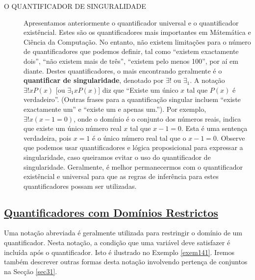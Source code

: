 \begin{description}
\item[O QUANTIFICADOR DE SINGURALIDADE] Apresentamos anteriormente o
quantificador universal e o quantificador existêncial. Estes são os
quantificadores mais importantes em Mátemática e Ciência da Computação. No
entanto, não existem limitações para o número de quantificadores que podemos
definir, tal como ``existem exactamente dois'', ``não existem mais de três'',
``existem pelo menos 100'', por aí em diante. Destes quantificadores, o mais
encontrando geralmente é o \textbf{quantificar de singularidade}, denotado por
$\exists!$ ou $\exists_1$. A notação $\exists!xP(x)$ [ou $\exists_1xP(x)$] diz
que ``Existe um único $x$ tal que $P(x)$ é verdadeiro''. (Outras frases para a
quantificação singular incluem ``existe exactamente um'' e ``existe um e apenas
um.''). Por exemplo, $\exists!x(x-1=0)$, onde o domínio é o conjunto dos números
reais, indica que existe um único número real $x$ tal que $x-1=0$. Esta é uma
sentença verdadeira, pois $x=1$ é o único número real tal que o $x-1=0$. Observe
que podemos usar quantificadores e lógica proposicional para expressar a
singularidade, caso queiramos evitar o uso do quantificador de singularidade.
Geralmente, é melhor permanecermos com o quantificador existêncial e universal
para que as regras de inferência para estes quantificadores possam ser
utilizadas.
\end{description}


\subsection*{\underline{Quantificadores com Domínios
Restrictos}}

Uma notação abreviada é geralmente utilizada para restringir o domínio de um
quantificador. Nesta notação, a condição que uma variável deve satisfazer é
incluída após o quantificador. Isto é ilustrado no Exemplo \ref{exem141}. Iremos
também descrever outras formas desta notação involvendo pertença de conjuntos na
Secção \ref{sec31}.

